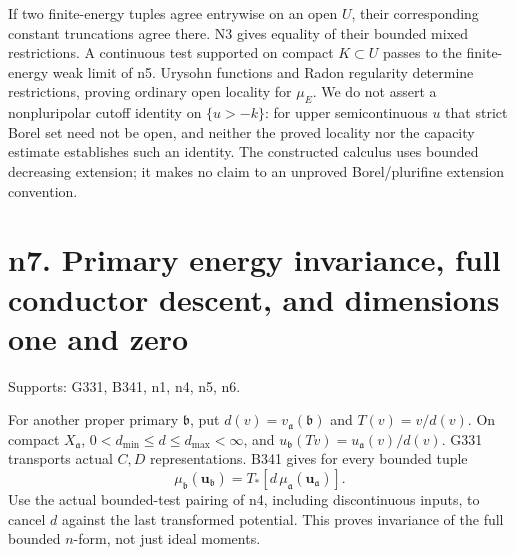 \documentclass[
  11pt,
]{article}
\begin{document}
If two finite-energy tuples agree entrywise on an open \(U\), their
corresponding constant truncations agree there. N3 gives equality of
their bounded mixed restrictions. A continuous test supported on compact
\(K\subset U\) passes to the finite-energy weak limit of n5. Urysohn
functions and Radon regularity determine restrictions, proving ordinary
open locality for \(\mu_E\). We do not assert a nonpluripolar cutoff
identity on \(\{u>-k\}\): for upper semicontinuous \(u\) that strict
Borel set need not be open, and neither the proved locality nor the
capacity estimate establishes such an identity. The constructed calculus
uses bounded decreasing extension; it makes no claim to an unproved
Borel/plurifine extension convention.

\section{n7. Primary energy invariance, full conductor descent, and
dimensions one and
zero}\label{n7.-primary-energy-invariance-full-conductor-descent-and-dimensions-one-and-zero}

Supports: G331, B341, n1, n4, n5, n6.

For another proper primary \(\mathfrak b\), put
\(d(v)=v_{\mathfrak a}(\mathfrak b)\) and \(T(v)=v/d(v)\). On compact
\(X_{\mathfrak a}\), \(0<d_{\min}\le d\le d_{\max}<\infty\), and
\(u_{\mathfrak b}(Tv)=u_{\mathfrak a}(v)/d(v)\). G331 transports actual
\(C,D\) representations. B341 gives for every bounded tuple
\[\mu_{\mathfrak b}(\boldsymbol u_{\mathfrak b})=T_*[d\,\mu_{\mathfrak a}(\boldsymbol u_{\mathfrak a})].\tag{29}\]
Use the actual bounded-test pairing of n4, including discontinuous
inputs, to cancel \(d\) against the last transformed potential. This
proves invariance of the full bounded \(n\)-form, not just ideal
moments.
\end{document}
